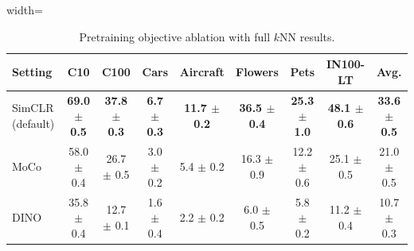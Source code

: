 \begin{table}[H]
\centering
\scriptsize
\setlength{\tabcolsep}{3.5pt}
\caption{Pretraining objective ablation with full $k$NN results.}
\label{tab:app_pretraining_knn}
\begin{adjustbox}{width=\textwidth}
\begin{tabular}{l c c c c c c c c}
\toprule
Setting & C10 & C100 & Cars & Aircraft & Flowers & Pets & IN100-LT & Avg. \\
\midrule
SimCLR (default) & \textbf{69.0 {\scriptsize$\pm$ 0.5}} & \textbf{37.8 {\scriptsize$\pm$ 0.3}} & \textbf{6.7 {\scriptsize$\pm$ 0.3}} & \textbf{11.7 {\scriptsize$\pm$ 0.2}} & \textbf{36.5 {\scriptsize$\pm$ 0.4}} & \textbf{25.3 {\scriptsize$\pm$ 1.0}} & \textbf{48.1 {\scriptsize$\pm$ 0.6}} & \textbf{33.6 {\scriptsize$\pm$ 0.5}} \\
MoCo & 58.0 {\scriptsize$\pm$ 0.4} & 26.7 {\scriptsize$\pm$ 0.5} & 3.0 {\scriptsize$\pm$ 0.2} & 5.4 {\scriptsize$\pm$ 0.2} & 16.3 {\scriptsize$\pm$ 0.9} & 12.2 {\scriptsize$\pm$ 0.6} & 25.1 {\scriptsize$\pm$ 0.5} & 21.0 {\scriptsize$\pm$ 0.5} \\
DINO & 35.8 {\scriptsize$\pm$ 0.4} & 12.7 {\scriptsize$\pm$ 0.1} & 1.6 {\scriptsize$\pm$ 0.4} & 2.2 {\scriptsize$\pm$ 0.2} & 6.0 {\scriptsize$\pm$ 0.5} & 5.8 {\scriptsize$\pm$ 0.2} & 11.2 {\scriptsize$\pm$ 0.4} & 10.7 {\scriptsize$\pm$ 0.3} \\
\bottomrule
\end{tabular}
\end{adjustbox}
\end{table}
